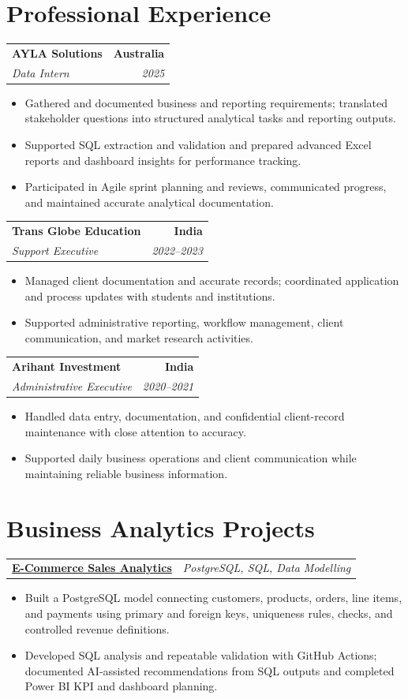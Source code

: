 \documentclass[letterpaper,10pt]{article}
\makeatletter
\newcommand{\role}[4]{%
  \begin{tabularx}{\textwidth}{@{}Xr@{}}
    \textbf{#1} & \textbf{#2} \\
    \textit{#3} & \textit{#4}
  \end{tabularx}\vspace{-1pt}
}
\newcommand{\project}[2]{%
  \begin{tabularx}{\textwidth}{@{}Xr@{}}
    \textbf{#1} & \textit{#2}
  \end{tabularx}\vspace{-1pt}
}
\makeatother
\begin{document}
\section{Professional Experience}
\role{AYLA Solutions}{Australia}{Data Intern}{2025}
\begin{itemize}
  \item Gathered and documented business and reporting requirements; translated stakeholder questions into structured analytical tasks and reporting outputs.
  \item Supported SQL extraction and validation and prepared advanced Excel reports and dashboard insights for performance tracking.
  \item Participated in Agile sprint planning and reviews, communicated progress, and maintained accurate analytical documentation.
\end{itemize}
\vspace{1pt}

\role{Trans Globe Education}{India}{Support Executive}{2022--2023}
\begin{itemize}
  \item Managed client documentation and accurate records; coordinated application and process updates with students and institutions.
  \item Supported administrative reporting, workflow management, client communication, and market research activities.
\end{itemize}
\vspace{1pt}

\role{Arihant Investment}{India}{Administrative Executive}{2020--2021}
\begin{itemize}
  \item Handled data entry, documentation, and confidential client-record maintenance with close attention to accuracy.
  \item Supported daily business operations and client communication while maintaining reliable business information.
\end{itemize}

\section{Business Analytics Projects}
\project{\href{https://github.com/jainalimehta/Ecommerce-Sales-Analytics}{E-Commerce Sales Analytics}}{PostgreSQL, SQL, Data Modelling}
\begin{itemize}
  \item Built a PostgreSQL model connecting customers, products, orders, line items, and payments using primary and foreign keys, uniqueness rules, checks, and controlled revenue definitions.
  \item Developed SQL analysis and repeatable validation with GitHub Actions; documented AI-assisted recommendations from SQL outputs and completed Power BI KPI and dashboard planning.
\end{itemize}
\vspace{1pt}
\end{document}
